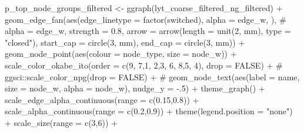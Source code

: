 \documentclass[
  letterpaper,
  DIV=11,
  numbers=noendperiod]{scrartcl}
\newenvironment{Shaded}{\begin{snugshade}}{\end{snugshade}}
\newcommand{\AttributeTok}[1]{\textcolor[rgb]{0.40,0.45,0.13}{#1}}
\newcommand{\CommentTok}[1]{\textcolor[rgb]{0.37,0.37,0.37}{#1}}
\newcommand{\ConstantTok}[1]{\textcolor[rgb]{0.56,0.35,0.01}{#1}}
\newcommand{\DecValTok}[1]{\textcolor[rgb]{0.68,0.00,0.00}{#1}}
\newcommand{\FloatTok}[1]{\textcolor[rgb]{0.68,0.00,0.00}{#1}}
\newcommand{\FunctionTok}[1]{\textcolor[rgb]{0.28,0.35,0.67}{#1}}
\newcommand{\NormalTok}[1]{\textcolor[rgb]{0.00,0.23,0.31}{#1}}
\newcommand{\OtherTok}[1]{\textcolor[rgb]{0.00,0.23,0.31}{#1}}
\newcommand{\SpecialCharTok}[1]{\textcolor[rgb]{0.37,0.37,0.37}{#1}}
\newcommand{\StringTok}[1]{\textcolor[rgb]{0.13,0.47,0.30}{#1}}
\begin{document}
\begin{Shaded}
\begin{Highlighting}[]
\NormalTok{p\_top\_node\_groups\_filtered }\OtherTok{\textless{}{-}} \FunctionTok{ggraph}\NormalTok{(lyt\_coarse\_filtered\_ng\_filtered) }\SpecialCharTok{+}
    \FunctionTok{geom\_edge\_fan}\NormalTok{(}\FunctionTok{aes}\NormalTok{(}\AttributeTok{edge\_linetype =} \FunctionTok{factor}\NormalTok{(switched), }\AttributeTok{alpha =}\NormalTok{ edge\_w, ), }\CommentTok{\# alpha = edge\_w, }
                  \AttributeTok{strength =} \FloatTok{0.8}\NormalTok{,}
                  \AttributeTok{arrow =} \FunctionTok{arrow}\NormalTok{(}\AttributeTok{length =} \FunctionTok{unit}\NormalTok{(}\DecValTok{2}\NormalTok{, }\StringTok{\textquotesingle{}mm\textquotesingle{}}\NormalTok{), }\AttributeTok{type =} \StringTok{"closed"}\NormalTok{),}
                  \AttributeTok{start\_cap =} \FunctionTok{circle}\NormalTok{(}\DecValTok{3}\NormalTok{, }\StringTok{\textquotesingle{}mm\textquotesingle{}}\NormalTok{),}
                  \AttributeTok{end\_cap =} \FunctionTok{circle}\NormalTok{(}\DecValTok{3}\NormalTok{, }\StringTok{\textquotesingle{}mm\textquotesingle{}}\NormalTok{)) }\SpecialCharTok{+}
    \FunctionTok{geom\_node\_point}\NormalTok{(}\FunctionTok{aes}\NormalTok{(}\AttributeTok{colour =}\NormalTok{ node\_type, }\AttributeTok{size =}\NormalTok{ node\_w)) }\SpecialCharTok{+}
    \FunctionTok{scale\_color\_okabe\_ito}\NormalTok{(}\AttributeTok{order =} \FunctionTok{c}\NormalTok{(}\DecValTok{9}\NormalTok{, }\DecValTok{7}\NormalTok{,}\DecValTok{1}\NormalTok{, }\DecValTok{2}\NormalTok{,}\DecValTok{3}\NormalTok{, }\DecValTok{6}\NormalTok{, }\DecValTok{8}\NormalTok{,}\DecValTok{5}\NormalTok{, }\DecValTok{4}\NormalTok{), }\AttributeTok{drop =} \ConstantTok{FALSE}\NormalTok{) }\SpecialCharTok{+}
    \CommentTok{\# ggsci::scale\_color\_npg(drop = FALSE) +}
    \CommentTok{\# geom\_node\_text(aes(label = name, size = node\_w, alpha = node\_w), nudge\_y = {-}.5) +}
    \FunctionTok{theme\_graph}\NormalTok{() }\SpecialCharTok{+}
        \FunctionTok{scale\_edge\_alpha\_continuous}\NormalTok{(}\AttributeTok{range =} \FunctionTok{c}\NormalTok{(}\FloatTok{0.15}\NormalTok{,}\FloatTok{0.8}\NormalTok{)) }\SpecialCharTok{+}
        \FunctionTok{scale\_alpha\_continuous}\NormalTok{(}\AttributeTok{range =} \FunctionTok{c}\NormalTok{(}\FloatTok{0.2}\NormalTok{,}\FloatTok{0.9}\NormalTok{)) }\SpecialCharTok{+}
        \FunctionTok{theme}\NormalTok{(}\AttributeTok{legend.position =} \StringTok{"none"}\NormalTok{) }\SpecialCharTok{+}
    \FunctionTok{scale\_size}\NormalTok{(}\AttributeTok{range =} \FunctionTok{c}\NormalTok{(}\DecValTok{3}\NormalTok{,}\DecValTok{6}\NormalTok{)) }\SpecialCharTok{+}

\end{Highlighting}
\end{Shaded}
\end{document}
